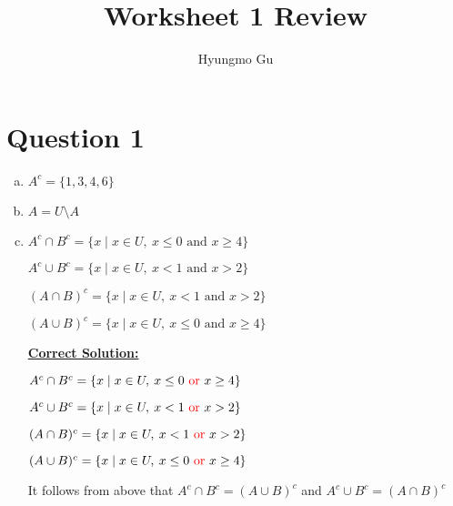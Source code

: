 \documentclass[12pt]{article}
\begin{document}
\title{Worksheet 1 Review}
\author{Hyungmo Gu}
\maketitle

\section*{Question 1}
\begin{enumerate}[a.]
    \item $A^c = \{1,3,4,6\}$
    \item $A = U \setminus A$
    \item

    $A^c \cap B^c = \{ x \mid x \in U,\:x \leq 0 \text{ and } x \geq 4 \}$

    $A^c \cup B^c = \{ x \mid x \in U,\:x < 1 \text{ and } x > 2 \}$

    $(A \cap B)^c = \{ x \mid x \in U,\:x < 1 \text{ and } x > 2\}$

    $(A \cup B)^c = \{ x \mid x \in U,\:x \leq 0 \text{ and } x \geq 4\}$

    \bigskip

    \begin{mdframed}
        \underline{\textbf{Correct Solution:}}

        \bigskip

        $A^c \cap B^c = \{ x \mid x \in U,\:x \leq 0 \color{red}\text{ or }\color{black} x \geq 4 \}$

        $A^c \cup B^c = \{ x \mid x \in U,\:x < 1 \color{red}\text{ or }\color{black} x > 2 \}$

        $(A \cap B)^c = \{ x \mid x \in U,\:x < 1 \color{red}\text{ or }\color{black} x > 2\}$

        $(A \cup B)^c = \{ x \mid x \in U,\:x \leq 0 \color{red}\text{ or }\color{black} x \geq 4\}$

        \color{red}It follows from above that $A^c \cap B^c = (A \cup B)^c$ and
        $A^c \cup B^c = (A \cap B)^c$\color{black}

    \end{mdframed}

\end{enumerate}
\end{document}
